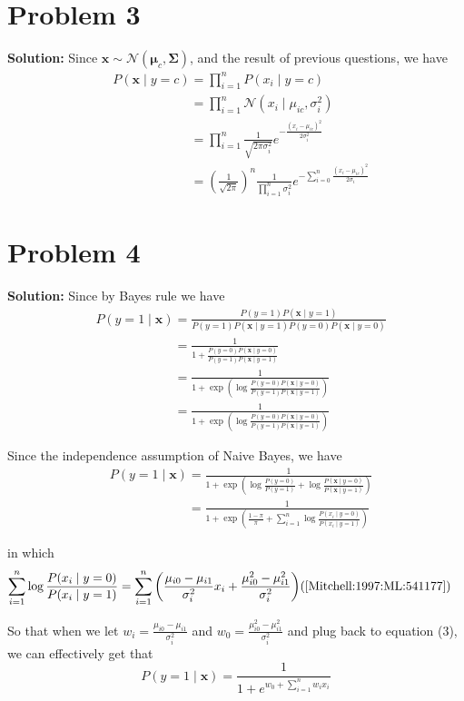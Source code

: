 \documentclass[11pt]{article}
\begin{document}
\section*{Problem 3}
\textbf{Solution:} 
	Since $\textbf{x} \sim \mathcal{N}(\mathbf{\mu}_c, \mathbf{\Sigma})$, and the result of previous questions, we have
		\begin{align}
			&P(\mathbf{x} \mid y = c) = \prod_{i = 1}^n P(x_i \mid y = c)\nonumber\\
			&\phantom{P(\mathbf{x} \mid y = c)} = \prod_{i = 1}^n \mathcal{N}(x_i \mid \mu_{ic}, \sigma_i^2)\nonumber\\
			&\phantom{P(\mathbf{x} \mid y = c)} = \prod_{i = 1}^n \frac{1}{\sqrt{2\pi\sigma_i^2}}e^{-\frac{(x_i - \mu_{ic})^2}{2\sigma_i^2}}\nonumber\\
			&\phantom{P(\mathbf{x} \mid y = c)} = \left(\frac{1}{\sqrt{2\pi}}\right)^n \frac{1}{\prod_{i = 1}^n \sigma_i^2} e^{-\sum_{i = 0}^n \frac{(x_i - \mu_{ic})^2}{2\sigma_i}}
		\end{align}
\section*{Problem 4}
\textbf{Solution:} 
	Since by Bayes rule we have 
	\begin{align}
		&P(y = 1 \mid \mathbf{x}) = \frac{P(y = 1)P(\mathbf{x} \mid y = 1)}{P(y = 1)P(\mathbf{x}\mid y = 1)P(y = 0)P(\mathbf{x}\mid y = 0)}\nonumber\\
		&\phantom{P(y = 1 \mid \mathbf{x})} = \frac{1}{1 + \frac{P(y = 0)P(\mathbf{x}\mid y = 0)}{P(y = 1)P(\mathbf{x}\mid y = 1)}}\nonumber\\
		&\phantom{P(y = 1 \mid \mathbf{x})} = \frac{1}{1 + \exp(\log\frac{P(y = 0)P(\mathbf{x}\mid y = 0)}{P(y = 1)P(\mathbf{x}\mid y = 1)})}\nonumber\\
		&\phantom{P(y = 1 \mid \mathbf{x})} = \frac{1}{1 + \exp(\log\frac{P(y = 0)P(\mathbf{x}\mid y = 0)}{P(y = 1)P(\mathbf{x}\mid y = 1)})}\nonumber
	\end{align}
	
	Since the independence assumption of Naive Bayes, we have
	\begin{align}
		&P(y = 1 \mid \mathbf{x}) = \frac{1}{1 + \exp(\log\frac{P(y = 0)}{P(y = 1)} + \log \frac{P(\mathbf{x}\mid y = 0)}{P(\mathbf{x}\mid y = 1)})}\nonumber\\
		&\phantom{P(y = 1 \mid \mathbf{x})} =  \frac{1}{1 + \exp(\frac{1 - \pi}{\pi} + \sum_{i = 1}^n \log \frac{P(x_i\mid y = 0)}{P(x_i\mid y = 1)})}
	\end{align}
	
	in which
	\begin{align}
		\sum_{i = 1}^n \log \frac{P(x_i\mid y = 0)}{P(x_i\mid y = 1)} = \sum_{i = 1}^n \left(\frac{\mu_{i0} - \mu_{i1}}{\sigma^2_i}x_i +  \frac{\mu_{i0}^2 - \mu_{i1}^2}{\sigma^2_i}\right) & (\cite{Mitchell:1997:ML:541177})\nonumber
	\end{align}
	
	So that when we let $w_i  = \frac{\mu_{i0} - \mu_{i1}}{\sigma^2_i}$ and $w_0 = \frac{\mu_{i0}^2 - \mu_{i1}^2}{\sigma^2_i}$ and plug back to equation (3), we can effectively get that
	\[P(y = 1 \mid \mathbf{x}) = \frac{1}{1 + e^{w_0 + \sum_{i = 1}^n w_i x_i}}\]
\newpage \nocite{*}


\end{document}
